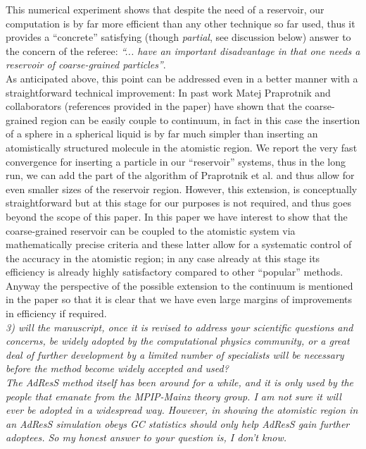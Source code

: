 \documentclass[12pt,a4paper]{article}
\begin{document}
This numerical experiment shows that despite the need of a reservoir, our computation is by far more efficient than any other technique so far used, thus it provides a ``concrete'' satisfying (though {\it partial}, see discussion below) answer to the concern of the referee: {\it ``... have an important disadvantage in that one needs a reservoir of coarse-grained particles''}.\\
As anticipated above, this point can be addressed even in a better manner with a straightforward technical improvement:
In past work Matej Praprotnik and collaborators (references provided in the paper) have shown that the coarse-grained region can be easily couple to continuum, in fact in this case the insertion of a sphere in a spherical liquid is by far much simpler than inserting an atomistically structured molecule in the atomistic region. We report the very fast convergence for inserting a particle in our ``reservoir'' systems, thus in the long run, we can add the part of the algorithm of Praprotnik et al. and thus allow for even smaller sizes of the reservoir region. However, this extension, is conceptually straightforward but at this stage for our purposes is not required, and thus goes beyond the scope of this paper. In this paper we have interest to show that the coarse-grained reservoir can be coupled to the atomistic system via mathematically precise criteria and these latter allow for a systematic control of the accuracy in the atomistic region; in any case already at this stage its efficiency is already highly satisfactory compared to other ``popular'' methods. Anyway the perspective of the possible extension to the continuum is mentioned in the paper so that it is clear that we have even large margins of improvements in efficiency if required.\\

{\color{teal} {\it 3) will the manuscript, once it is revised to address your scientific
questions and concerns, be widely adopted by the computational physics 
community, or a great deal of further development by a limited number
of specialists will be necessary before the method become widely
accepted and used?\\


The AdResS method itself has been around for a while, and it is only
used by the people that emanate from the MPIP-Mainz theory group. I am
not sure it will ever be adopted in a widespread way. However, in
showing the atomistic region in an AdResS simulation obeys GC
statistics should only help AdResS gain further adoptees. So my honest
answer to your question is, I don't know.}}\\
\end{document}
